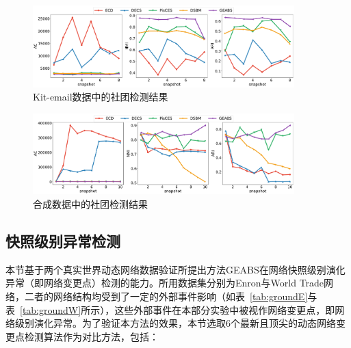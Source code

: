 \begin{figure}
	\centering
	\includegraphics[width=0.9\textwidth]{figures/chap05/Kit-emaili2Communitydetection.pdf}
	\caption{Kit-email数据中的社团检测结果}
	\label{fig4:kit-email}
\end{figure}
\begin{figure}
	\centering
	\includegraphics[width=0.9\textwidth]{figures/chap05/mergesplitC.pdf}
	\caption{合成数据中的社团检测结果}
	\label{fig4:mergesplitC}
\end{figure}


 







 
\subsection{快照级别异常检测}

本节基于两个真实世界动态网络数据验证所提出方法GEABS在网络快照级别演化异常（即网络变更点）检测的能力。所用数据集分别为Enron与World Trade网络，二者的网络结构均受到了一定的外部事件影响（如表~\ref{tab:groundE}与表~\ref{tab:groundW}所示），这些外部事件在本部分实验中被视作网络变更点，即网络级别演化异常。为了验证本方法的效果，本节选取$6$个最新且顶尖的动态网络变更点检测算法作为对比方法，包括：

